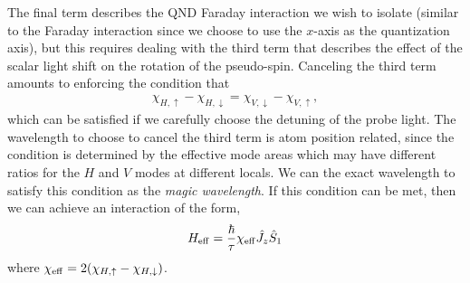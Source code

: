 \documentclass[]{report}
\begin{document}
The final term describes the QND Faraday interaction we wish to isolate (similar to the Faraday interaction since we choose to use the $ x $-axis as the quantization axis), but this requires dealing with the third term that describes the effect of the scalar light shift on the rotation of the pseudo-spin.  Canceling the third term amounts to enforcing the condition that
	\begin{align}
		\chi_{H,\uparrow} - \chi_{H,\downarrow} = \chi_{V,\downarrow} - \chi_{V,\uparrow} ,
	\end{align}
which can be satisfied if we carefully choose the detuning of the probe light. The wavelength to choose to cancel the third term is atom position related, since the condition is determined by the effective mode areas which may have different ratios for the $ H $ and $ V $ modes at different locals. We can the exact wavelength to satisfy this condition as the \textit{magic wavelength}. If this condition can be met, then we can achieve an interaction of the form,
	\begin{align}
		H_{\rm eff} = \frac{\hbar}{\tau} \chi_{\rm eff} \hat{J}_z \hat{S}_1
	\end{align}
where $\chi_{\rm eff} = 2(\chi_{H,\uparrow} - \chi_{H,\downarrow})$.  
\end{document}
